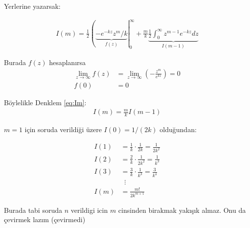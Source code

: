 \documentclass{article}
\numberwithin{equation}{section}
\begin{document}
Yerlerine yazarsak:

\begin{align}
    \label{eq:Im}
    I(m) = \frac{1}{2}\left(\underbrace{-e^{-kz}z^m/k}_{f(z)}\right|_0^\infty + \frac{m}{k}\underbrace{\frac{1}{2}\int_0^\infty z^{m-1}e^{-kz}dz}_{I(m-1)} 
\end{align}

Burada $f(z)$ hesaplanırsa 
\begin{align}
\lim_{z \to \infty} f(z) &= \lim_{z \to \infty} \left(-\frac{z^m}{e^{kz}}\right) = 0 \\
f(0) &= 0 
\end{align}


Böylelikle Denklem \eqref{eq:Im}: 
\begin{align}
    I(m) = \frac{m}{k} I(m-1) 
\end{align}

$m=1$ için soruda verildiği üzere $I(0) = 1/(2k)$ olduğundan: 

\begin{align}
    I(1) &= \frac{1}{k} \cdot \frac{1}{2k} = \frac{1}{2k^2} \\
    I(2) &= \frac{2}{k} \cdot \frac{1}{2k^2} = \frac{1}{k^3} \\
    I(3) &= \frac{3}{k} \cdot \frac{1}{k^3} = \frac{3}{k^4} \\
      & \;\;\vdots \\
    I(m) &= \frac{m!}{2k^{m+1}} 
\end{align}

Burada tabi soruda $n$ verildigi icin $m$ cinsinden birakmak yakışık almaz. Onu da çevirmek lazım (çevirmedi)
\end{document}
